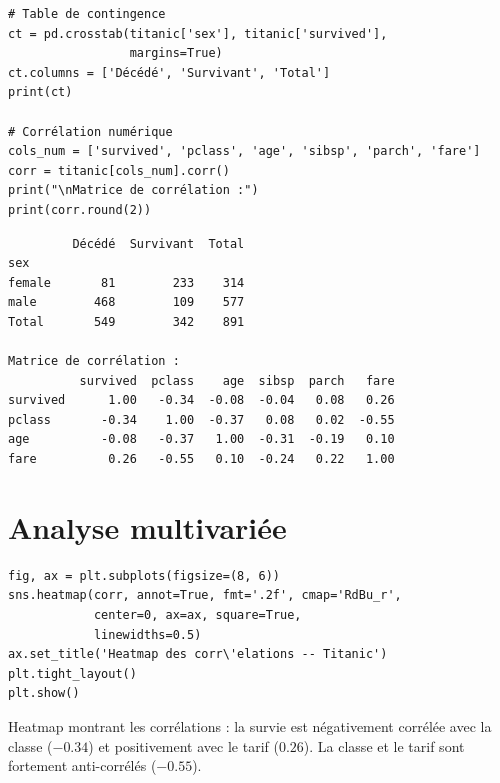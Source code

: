\begin{codeblock}[title=\textbf{Python}]
\begin{verbatim}
# Table de contingence
ct = pd.crosstab(titanic['sex'], titanic['survived'],
                 margins=True)
ct.columns = ['Décédé', 'Survivant', 'Total']
print(ct)

# Corrélation numérique
cols_num = ['survived', 'pclass', 'age', 'sibsp', 'parch', 'fare']
corr = titanic[cols_num].corr()
print("\nMatrice de corrélation :")
print(corr.round(2))
\end{verbatim}
\end{codeblock}

\begin{codeoutput}
\begin{verbatim}
         Décédé  Survivant  Total
sex
female       81        233    314
male        468        109    577
Total       549        342    891

Matrice de corrélation :
          survived  pclass    age  sibsp  parch   fare
survived      1.00   -0.34  -0.08  -0.04   0.08   0.26
pclass       -0.34    1.00  -0.37   0.08   0.02  -0.55
age          -0.08   -0.37   1.00  -0.31  -0.19   0.10
fare          0.26   -0.55   0.10  -0.24   0.22   1.00
\end{verbatim}
\end{codeoutput}

\section{Analyse multivari\'ee}

\begin{codeblock}[title=\textbf{Python}]
\begin{verbatim}
fig, ax = plt.subplots(figsize=(8, 6))
sns.heatmap(corr, annot=True, fmt='.2f', cmap='RdBu_r',
            center=0, ax=ax, square=True,
            linewidths=0.5)
ax.set_title('Heatmap des corr\'elations -- Titanic')
plt.tight_layout()
plt.show()
\end{verbatim}
\end{codeblock}

\begin{codeoutput}
Heatmap montrant les corr\'elations : la survie est n\'egativement corr\'el\'ee avec la classe ($-0.34$) et positivement avec le tarif ($0.26$). La classe et le tarif sont fortement anti-corr\'el\'es ($-0.55$).
\end{codeoutput}

